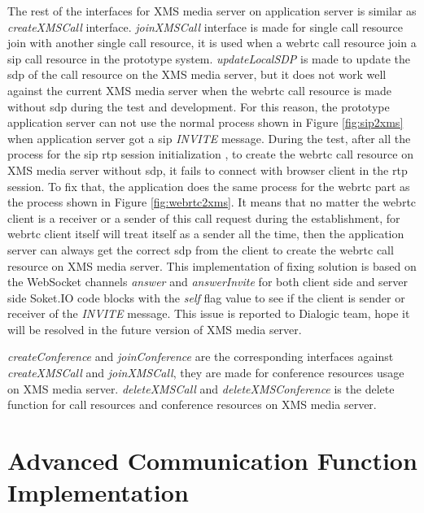 \par The rest of the interfaces for XMS media server on application server is similar as \textit{createXMSCall} interface. \textit{joinXMSCall} interface is made for single call resource join with another single call resource, it is used when a \gls{webrtc} call resource join a \gls{sip} call resource in the prototype system. \textit{updateLocalSDP} is made to update the \gls{sdp} of the call resource on the XMS media server, but it does not work well against the current XMS media server when the \gls{webrtc} call resource is made without \gls{sdp} during the test and development. For this reason, the prototype application server can not use the normal process shown in Figure \ref{fig:sip2xms} when application server got a \gls{sip} \textit{INVITE} message. During the test, after all the process for the \gls{sip} \gls{rtp} session initialization , to create the \gls{webrtc} call resource on XMS media server without \gls{sdp}, it fails to connect with browser client in the \gls{rtp} session. To fix that, the application does the same process for the \gls{webrtc} part as the process shown in Figure \ref{fig:webrtc2xms}. It means that no matter the \gls{webrtc} client is a receiver or a sender of this call request during the establishment, for \gls{webrtc} client itself will treat itself as a sender all the time, then the application server can always get the correct \gls{sdp} from the client to create the \gls{webrtc} call resource on XMS media server. This implementation of fixing solution is based on the WebSocket channels \textit{answer} and \textit{answerInvite} for both client side and server side Soket.IO code blocks with the \textit{self} flag value to see if the client is sender or receiver of the \textit{INVITE} message. This issue is reported to Dialogic team, hope it will be resolved in the future version of XMS media server.

\par \textit{createConference} and \textit{joinConference} are the corresponding interfaces against \textit{createXMSCall} and \textit{joinXMSCall}, they are made for conference resources usage on XMS media server. \textit{deleteXMSCall} and \textit{deleteXMSConference} is the delete function for call resources and conference resources on XMS media server.

\section{Advanced Communication Function Implementation}

